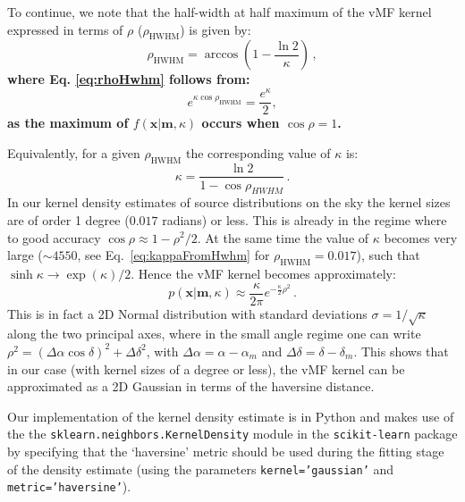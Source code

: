 \documentclass[onecolumn]{aa} %
\begin{document}
\begin{appendix}
To continue, we note that the half-width at half maximum of the vMF kernel expressed in terms of
$\rho$ ($\rho_\mathrm{HWHM}$) is given by:
\begin{equation}
  \rho_\mathrm{HWHM} = \arccos\left(1-\frac{\ln 2}{\kappa}\right)\,,
  \label{eq:rhoHwhm}
\end{equation}
\textbf{where Eq. \ref{eq:rhoHwhm} follows from:}
\begin{equation}
e^{\kappa\cos\rho_{\mathrm{HWHM}}} = \frac{e^{\kappa}}{2}, 
\end{equation}
\textbf{as the maximum of $f(\mathbf{x}|\mathbf{m}, \kappa)$ occurs when $\cos\rho = 1$.}\\
\noindent


Equivalently, for a given $\rho_\mathrm{HWHM}$ the corresponding value of $\kappa$ is:
\begin{equation}
  \kappa = \frac{\ln 2}{1-\cos\rho_{HWHM}}\,.
  \label{eq:kappaFromHwhm}
\end{equation}
In our kernel density estimates of source distributions on the sky the kernel sizes are of order 1
degree ($0.017$ radians) or less. This is already in the regime where  to good accuracy
$\cos\rho\approx 1-\rho^2/2$. At the same time the value of $\kappa$ becomes very large ($\sim4550$,
see Eq.\ \ref{eq:kappaFromHwhm} for $\rho_\mathrm{HWHM}=0.017$), such that $\sinh\kappa
\rightarrow \exp(\kappa)/2$. Hence the vMF kernel becomes approximately:
\begin{equation}
  p(\mathbf{x}|\mathbf{m},\kappa) \approx \frac{\kappa}{2\pi}e^{-\frac{\kappa}{2}\rho^2}\,.
\end{equation}
This is in fact a 2D Normal distribution with standard deviations $\sigma=1/\sqrt{\kappa}$ along the
two principal axes, where in the small angle regime one can write $\rho^2 =
(\Delta\alpha\cos\delta)^2 + \Delta\delta^2$, with $\Delta\alpha=\alpha-\alpha_m$ and
$\Delta\delta=\delta-\delta_m$. This shows that in our case (with kernel sizes of a degree or less),
the vMF kernel can be approximated as a 2D Gaussian in terms of the haversine distance.

Our implementation of the kernel density estimate is in Python and makes use of the the
\texttt{sklearn.neighbors.KernelDensity} module in the \texttt{scikit-learn} package by specifying
that the `haversine' metric should be used during the fitting stage of the density estimate (using
the parameters \texttt{kernel='gaussian'} and \texttt{metric='haversine'}).

\end{appendix}
\end{document}
